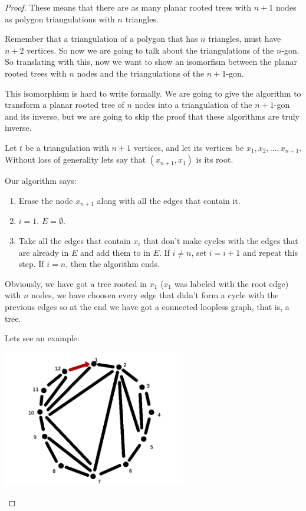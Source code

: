 \begin{proof}
    These means that there are as many planar rooted trees with $n + 1$ nodes as polygon triangulations with $n$ triangles.\pn
    
    Remember that a triangulation of a polygon that has $n$ triangles, must have $n + 2$ vertices. So now we are going to talk about
    the triangulations of the $n$-gon. So translating with this, now we want to show an isomorfism between the planar rooted trees with $n$ nodes
    and the triangulations of the $n + 1$-gon.\pn
    
    This isomorphism is hard to write formally. We are going to give the algorithm to transform a planar rooted tree of $n$ nodes into a triangulation
    of the $n + 1$-gon and its inverse, but we are going to skip the proof that these algorithms are truly inverse.\pn
    
    Let $t$ be a triangulation with $n+1$ vertices, and let its vertices be $x_1, x_2, \dots, x_{n+1}$. Without loss of generality lets say that
    $(x_{n+1}, x_1)$ is its root.\pn
    
    Our algorithm says:
    
    \begin{enumerate}
        \item 
            Erase the node $x_{n+1}$ along with all the edges that contain it.
        \item
            $i = 1.$\pn
            $E = \emptyset.$
        
        \item
            Take all the edges that contain $x_i$ that don't make cycles with the edges that are already in $E$ and
            add them to in $E$. If $i \neq n$, set $i = i + 1$ and repeat this step. If $i = n$, then the algorithm ends.
    \end{enumerate}
    
    Obviously, we have got a tree rooted in $x_1$ ($x_1$ was labeled with the root edge) with $n$ nodes, we have choosen every edge that 
    didn't form a cycle with the previous edges so at the end we have got a connected loopless graph, that is, a tree.\pn
    
    Lets see an example:\pn
    \begin{center}
        \includegraphics[width=8cm]{Homework1/Problem4/TriangulationToPlanarRootedTree1.png}
    \end{center}
    

\end{proof}
